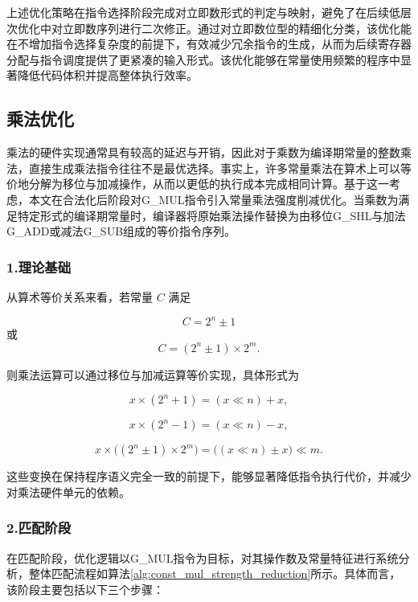 \par

上述优化策略在指令选择阶段完成对立即数形式的判定与映射，避免了在后续低层次优化中对立即数序列进行二次修正。通过对立即数位型的精细化分类，该优化能在不增加指令选择复杂度的前提下，有效减少冗余指令的生成，从而为后续寄存器分配与指令调度提供了更紧凑的输入形式。该优化能够在常量使用频繁的程序中显著降低代码体积并提高整体执行效率。


\subsection{乘法优化}
乘法的硬件实现通常具有较高的延迟与开销，因此对于乘数为编译期常量的整数乘法，直接生成乘法指令往往不是最优选择。事实上，许多常量乘法在算术上可以等价地分解为移位与加减操作，从而以更低的执行成本完成相同计算。基于这一考虑，本文在合法化后阶段对G\_MUL指令引入常量乘法强度削减优化。当乘数为满足特定形式的编译期常量时，编译器将原始乘法操作替换为由移位G\_SHL与加法G\_ADD或减法G\_SUB组成的等价指令序列。


\subsubsection{1.理论基础}
从算术等价关系来看，若常量 $C$ 满足

\begin{equation}
	C = 2^n \pm 1
\end{equation}
或
\begin{equation}
	C = (2^n \pm 1) \times 2^m.
\end{equation}

则乘法运算可以通过移位与加减运算等价实现，具体形式为

\begin{equation}
	x \times (2^n + 1) = (x \ll n) + x,
\end{equation}

\begin{equation}
	x \times (2^n - 1) = (x \ll n) - x,
\end{equation}

\begin{equation}
	x \times \big((2^n \pm 1) \times 2^m\big)
	= \big((x \ll n) \pm x\big) \ll m.\textsf{}
\end{equation}

这些变换在保持程序语义完全一致的前提下，能够显著降低指令执行代价，并减少对乘法硬件单元的依赖。


\subsubsection{2.匹配阶段}
在匹配阶段，优化逻辑以G\_MUL指令为目标，对其操作数及常量特征进行系统分析，整体匹配流程如算法\ref{alg:const_mul_strength_reduction}所示。具体而言，该阶段主要包括以下三个步骤：

